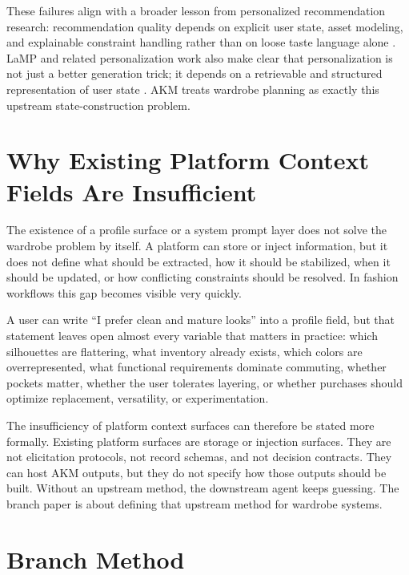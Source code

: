 \documentclass[11pt]{article}
\begin{document}
These failures align with a broader lesson from personalized recommendation research: recommendation quality depends on explicit user state, asset modeling, and explainable constraint handling rather than on loose taste language alone \citep{lu2019binarycode,kang2019completelook,lu2021learnableanchors,sarkar2022outfittransformer,li2021personalizedtransformer,cheng2023erra,hsiao2018capsulewardrobes}. LaMP and related personalization work also make clear that personalization is not just a better generation trick; it depends on a retrievable and structured representation of user state \citep{salemi2023lamp}. AKM treats wardrobe planning as exactly this upstream state-construction problem.

\section{Why Existing Platform Context Fields Are Insufficient}

The existence of a profile surface or a system prompt layer does not solve the wardrobe problem by itself. A platform can store or inject information, but it does not define what should be extracted, how it should be stabilized, when it should be updated, or how conflicting constraints should be resolved. In fashion workflows this gap becomes visible very quickly.

A user can write ``I prefer clean and mature looks'' into a profile field, but that statement leaves open almost every variable that matters in practice: which silhouettes are flattering, what inventory already exists, which colors are overrepresented, what functional requirements dominate commuting, whether pockets matter, whether the user tolerates layering, or whether purchases should optimize replacement, versatility, or experimentation.

The insufficiency of platform context surfaces can therefore be stated more formally. Existing platform surfaces are storage or injection surfaces. They are not elicitation protocols, not record schemas, and not decision contracts. They can host AKM outputs, but they do not specify how those outputs should be built. Without an upstream method, the downstream agent keeps guessing. The branch paper is about defining that upstream method for wardrobe systems.

\section{Branch Method}
\end{document}

